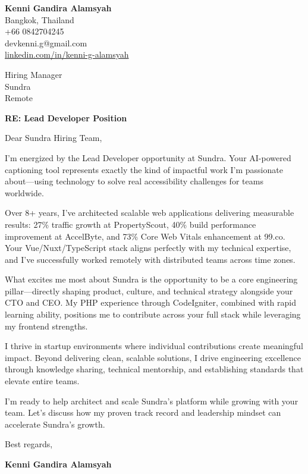 \documentclass[11pt]{article}
\begin{document}
\begin{flushleft}
\textbf{Kenni Gandira Alamsyah}\\
Bangkok, Thailand\\
+66 0842704245\\
devkenni.g@gmail.com\\
\href{https://www.linkedin.com/in/kenni-g-alamsyah/}{linkedin.com/in/kenni-g-alamsyah}
\end{flushleft}

\vspace{1em}

\begin{flushleft}
Hiring Manager\\
Sundra\\
Remote
\end{flushleft}

\vspace{1em}

\textbf{RE: Lead Developer Position}

\vspace{1em}

Dear Sundra Hiring Team,

I'm energized by the Lead Developer opportunity at Sundra. Your AI-powered captioning tool represents exactly the kind of impactful work I'm passionate about—using technology to solve real accessibility challenges for teams worldwide.

Over 8+ years, I've architected scalable web applications delivering measurable results: 27\% traffic growth at PropertyScout, 40\% build performance improvement at AccelByte, and 73\% Core Web Vitals enhancement at 99.co. Your Vue/Nuxt/TypeScript stack aligns perfectly with my technical expertise, and I've successfully worked remotely with distributed teams across time zones.

What excites me most about Sundra is the opportunity to be a core engineering pillar—directly shaping product, culture, and technical strategy alongside your CTO and CEO. My PHP experience through CodeIgniter, combined with rapid learning ability, positions me to contribute across your full stack while leveraging my frontend strengths.

I thrive in startup environments where individual contributions create meaningful impact. Beyond delivering clean, scalable solutions, I drive engineering excellence through knowledge sharing, technical mentorship, and establishing standards that elevate entire teams.

I'm ready to help architect and scale Sundra's platform while growing with your team. Let's discuss how my proven track record and leadership mindset can accelerate Sundra's growth.

\vspace{1em}

Best regards,

\textbf{Kenni Gandira Alamsyah}
\end{document}
